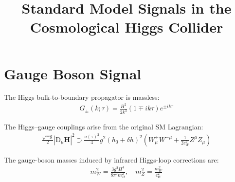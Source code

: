 \documentclass[a4paper,12pt]{article}
\title{\Large\textbf{Standard Model Signals in the Cosmological Higgs Collider}\\[2mm]}
\author{}
\def\mb{\mathbf}
\def\de{\delta}
\begin{document}
\date{}
\maketitle






\section{Gauge Boson Signal}
The Higgs bulk-to-boundary propagator is massless:
\begin{align}
    G_\pm(k; \tau) = \frac{H^2}{2k^3} (1 \mp ik\tau) e^{\pm ik\tau}
\end{align}

The Higgs--gauge couplings arise from the original SM Lagrangian:
\begin{align}
    \frac{\sqrt{-g}}{2}|\mathrm{D}_\mu \mb H |^2 \supset \frac{ a(\tau)^2}{4} g^2 (h_0 + \de h)^2 \left( W^+_\mu W^{-\mu} + \frac{1}{2c_W^2} Z^\mu Z_\mu \right)
\end{align}

The gauge-boson masses induced by infrared Higgs-loop corrections are:
\begin{align}
    m_W^2 = \frac{3 g^2 H^4}{8 \pi^2 m_H^2}, \quad m_Z^2 = \frac{m^2_W}{c^2_W}
\end{align}
\end{document}
